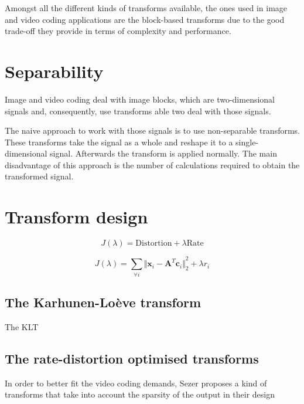 \documentclass[11pt,a4paper,openright,twoside]{book}
\numberwithin{equation}{section} %
\begin{document}
Amongst all the different kinds of transforms available, the ones used
in image and video coding applications are the block-based transforms
due to the good trade-off they provide in terms of complexity and
performance.

\section{Separability}
\label{sec:separability}

Image and video coding deal with image blocks, which are two-dimensional
signals and, consequently, use transforms able two deal with those
signals.

The naive approach to work with those signals is to use non-separable
transforms.
These transforms take the signal as a whole and reshape it to a
single-dimensional signal.
Afterwards the transform is applied normally.
The main disadvantage of this approach is the number of calculations
required to obtain the transformed signal.

\section{Transform design}
\label{sec:transform_design}
\def\x{\mathbf{x}}
\def\c{\mathbf{c}}
\def\A{\mathbf{A}}

\begin{equation}
	J(\lambda) = \text{Distortion} + \lambda \text{Rate}
\end{equation}

\begin{equation}
	J(\lambda) = \sum\limits_{\forall i}{\Vert \x_i - \A^T \c_i \Vert}_2^2
	+ \lambda r_i
\end{equation}

\subsection{The Karhunen-Loève transform}
\label{sub:the_karhunen_loeve_transform}
The \ac{KLT}

\subsection{The rate-distortion optimised transforms}
\label{sub:the_rate_distortion_optimised_transforms}

In order to better fit the video coding demands, Sezer proposes a kind
of transforms that take into account the sparsity of the output in their
design~\cite{sezer-11-phd}
\end{document}
